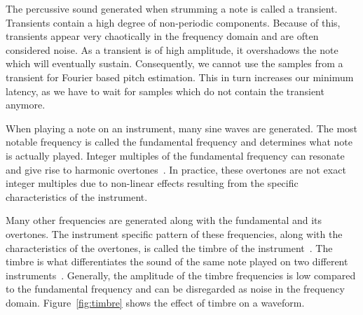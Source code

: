 \documentclass[a4paper,10pt,twocolumn]{article}
\begin{document}
The percussive sound generated when strumming a note is called a transient. Transients contain a high degree of non-periodic components. Because of this, transients appear very chaotically in the frequency domain and are often considered noise. As a transient is of high amplitude, it overshadows the note which will eventually sustain. Consequently, we cannot use the samples from a transient for Fourier based pitch estimation. This in turn increases our minimum latency, as we have to wait for samples which do not contain the transient anymore.

When playing a note on an instrument, many sine waves are generated. The most notable frequency is called the fundamental frequency and determines what note is actually played. Integer multiples of the fundamental frequency can resonate and give rise to harmonic overtones~\cite{overtones}. In practice, these overtones are not exact integer multiples due to non-linear effects resulting from the specific characteristics of the instrument.

Many other frequencies are generated along with the fundamental and its overtones. The instrument specific pattern of these frequencies, along with the characteristics of the overtones, is called the timbre of the instrument~\cite{timbre}. The timbre is what differentiates the sound of the same note played on two different instruments~\cite{perception}. Generally, the amplitude of the timbre frequencies is low compared to the fundamental frequency and can be disregarded as noise in the frequency domain. Figure~\ref{fig:timbre} shows the effect of timbre on a waveform.
\end{document}
